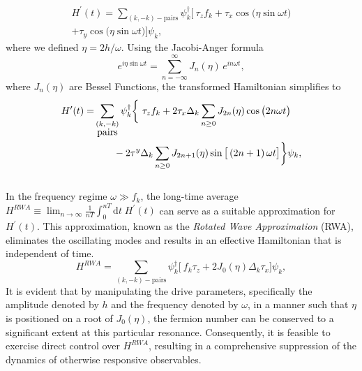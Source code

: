 \documentclass[%
reprint,
superscriptaddress,
amsmath,amssymb,
aps,
prb,
showkeys,
]{revtex4-2}
\begin{document}
	\begin{multline}
		\label{eq:rotated:tfim}
		H^\prime(t) = \sum_{(k,-k)-\mbox{pairs}} \psi^\dagger_k
		\bigg[\ \tau_z f_k + \tau_x \cos{\big(\eta\sin{\omega t}\big)}  \\
		+ \tau_y \cos{\big(\eta\sin{\omega t}\big)}\bigg]\psi_k,
	\end{multline}
	where we defined $\eta=2h/\omega$. Using the Jacobi-Anger formula~\cite{arfkenmath}
	\begin{equation}
		\label{eq:jacobi}
	e^{i \eta \sin{\omega t}} = \displaystyle\sum_{n=-\infty}^{\infty} J_n(\eta)\, e^{i n \omega t},
	\end{equation} 
	where $J_n(\eta)$ are Bessel Functions, the transformed Hamiltonian simplifies to \\
	\begin{align}
		H^\prime(t) =& \sum_{\substack{(k,-k) \\ \mbox{pairs}}} \psi^\dagger_k
		\bigg\{\ \tau_z f_k + 2\tau_x \Delta_k \sum_{n\geq 0} J_{2n}(\eta)\cos{\big(2n\omega t\big)} \nonumber\\
		&\hskip 0.7cm- 2\tau^y\Delta_k \sum_{n\geq 0} J_{2n+1}(\eta)\sin{\big[\left(2n+1\right)\omega t\big]}   \bigg\}\psi_k,
	\end{align}\\
	In the frequency regime  $\omega \gg f_k$, the long-time average $H^{RWA}\equiv\displaystyle\lim_{n\rightarrow\infty}\frac{1}{nT}\int^{nT}_0\mathrm{d}t\;H^\prime(t)$ can serve as a suitable approximation for $H^\prime(t)$. This approximation, known as the \emph{Rotated Wave Approximation} (RWA), eliminates the oscillating modes and results in an effective Hamiltonian that is independent of time.
	\begin{equation}
		\label{eq:hrwa:tfim}
		H^{RWA} = \sum_{(k,-k)-\mbox{pairs}} \psi^\dagger_k
		\bigg[\ f_k\tau_z + 2 J_0(\eta) \Delta_k\tau_x \bigg]\psi_k,
	\end{equation}
	It is evident that by manipulating the drive parameters, specifically the amplitude denoted by $h$ and the frequency denoted by $\omega$, in a manner such that $\eta$ is positioned on a root of $J_0(\eta)$, the fermion number can be conserved to a significant extent at this particular resonance. Consequently, it is feasible to exercise direct control over $H^{RWA}$, resulting in a comprehensive suppression of the dynamics of otherwise responsive observables. 
	
\end{document}
